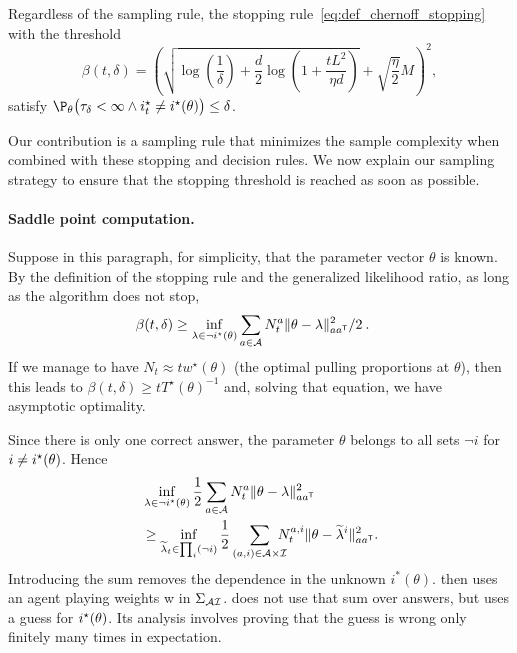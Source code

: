 \begin{lemma}
\label{lem:chernoff_stopping rule_pac}
Regardless of the sampling rule, the stopping rule~\eqref{eq:def_chernoff_stopping} with the threshold
{\small\begin{equation} \label{eq:def_beta}
\beta(t,\delta) =\left( \sqrt{\log\!\left( \frac{1}{\delta}\right)+\frac{d}{2}\log\!\left(1+\frac{t L^2}{\eta d} \right)} +\sqrt{\frac{\eta}{2}}M\right)^2\!\!\!,
\end{equation}}
satisfy $ \P_{\theta}\big(\tau_{\delta} < \infty \wedge \istar_t \neq \istar(\theta)\big) \leq \delta$.
\end{lemma}
Our contribution is a sampling rule that minimizes the sample complexity when combined with these stopping and decision rules.
We now explain our sampling strategy to ensure that the stopping threshold is reached as soon as possible.

\paragraph{Saddle point computation.}
Suppose in this paragraph, for simplicity, that the parameter vector $\theta$ is known. By the definition of the stopping rule and the generalized likelihood ratio, as long as the algorithm does not stop,
\begin{align*}
\beta(t,\delta)
&\ge \inf_{\lambda\in \neg i^\star(\theta)} \sum_{a\in \mathcal{A}} N_t^a \Vert \theta - \lambda \Vert^2_{a a^{\mathsf{\scriptscriptstyle T}}}/2 \: .
\end{align*}
If we manage to have $N_t \approx t w^\star(\theta)$ (the optimal pulling proportions at $\theta$), then this leads to $\beta(t,\delta) \ge t T^\star(\theta)^{-1}$ and, solving that equation, we have asymptotic optimality.

Since there is only one correct answer, the parameter $\theta$ belongs to all sets $\neg i$ for $i\neq i^\star(\theta)$. Hence
\begin{align*}
&\inf_{\lambda\in \neg i^\star(\theta)}\frac{1}{2} \sum_{a\in \mathcal{A}} N_t^a \Vert \theta - \lambda \Vert^2_{a a^{\mathsf{\scriptscriptstyle T}}}
\\&\geq \inf_{\widetilde{\lambda}_t\in \prod_i (\neg i)}\frac{1}{2}\sum_{(a,i)\in \mathcal{A}\times\mathcal{I}}\!\!\!\!\! N_t^{a,i} \Vert \theta - \widetilde{\lambda}^i \Vert^2_{a a^{\mathsf{\scriptscriptstyle T}}}.
\end{align*} Introducing the sum removes the dependence in the unknown $i^*(\theta)$. \LGC then uses an agent playing weights w in $\Sigma_{\mathcal{A}\mathcal{I}}$. \LG does not use that sum over answers, but uses a guess for $i^\star(\theta)$. Its analysis involves proving that the guess is wrong only finitely many times in expectation.

